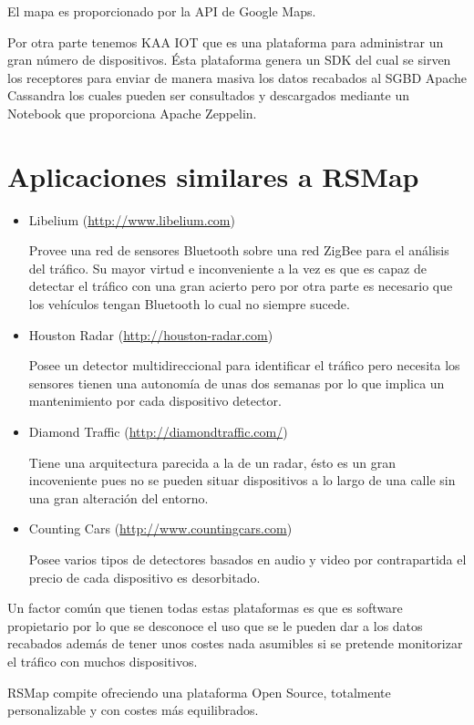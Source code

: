 El mapa es proporcionado por la API de Google Maps.

Por otra parte tenemos KAA IOT que es una plataforma para administrar un gran número de dispositivos. Ésta plataforma genera un SDK del cual se sirven los receptores para enviar de manera masiva los datos recabados al SGBD Apache Cassandra los cuales pueden ser consultados y descargados mediante un Notebook que proporciona Apache Zeppelin.

\section{Aplicaciones similares a RSMap}
\begin{itemize}
  \item Libelium (\url{http://www.libelium.com})

    Provee una red de sensores Bluetooth sobre una red ZigBee para el análisis del tráfico. Su mayor virtud e inconveniente a la vez es que es capaz de detectar el tráfico con una gran acierto pero por otra parte es necesario que los vehículos tengan Bluetooth lo cual no siempre sucede.
  \item Houston Radar (\url{http://houston-radar.com})

    Posee un detector multidireccional para identificar el tráfico pero necesita los sensores tienen una autonomía de unas dos semanas por lo que implica un mantenimiento por cada dispositivo detector.
  \item Diamond Traffic (\url{http://diamondtraffic.com/})

    Tiene una arquitectura parecida a la de un radar, ésto es un gran incoveniente pues no se pueden situar dispositivos a lo largo de una calle sin una gran alteración del entorno.
  \item Counting Cars (\url{http://www.countingcars.com})

    Posee varios tipos de detectores basados en audio y video por contrapartida el precio de cada dispositivo es desorbitado.
\end{itemize}

Un factor común que tienen todas estas plataformas es que es software propietario por lo que se desconoce el uso que se le pueden dar a los datos recabados además de tener unos costes nada asumibles si se pretende monitorizar el tráfico con muchos dispositivos.

RSMap compite ofreciendo una plataforma Open Source, totalmente personalizable y con costes más equilibrados.

